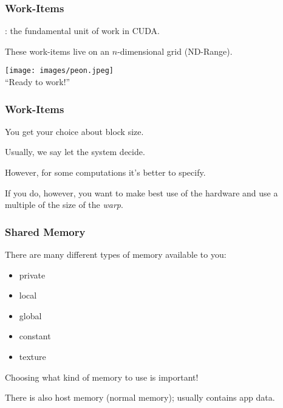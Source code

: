 \begin{frame}
  \frametitle{Work-Items}


    : the fundamental unit of work in CUDA.
    
 These work-items live on an $n$-dimensional grid (ND-Range).
    
    \begin{center}
	\texttt{[image: images/peon.jpeg]}\\
	\hfill ``Ready to work!''
	\end{center}
    
\end{frame}
    
\begin{frame}
\frametitle{Work-Items}
    
You get your choice about block size. 

Usually, we say let the system decide. 

However, for some computations it's better to specify.

If you do, however, you want to make best use of the hardware and use a multiple of the size of the \textit{warp}.


\end{frame}

\begin{frame}
  \frametitle{Shared Memory}


  There are many different types of memory available to you:


\begin{itemize}
\item private
\item local
\item global
\item constant
\item texture
\end{itemize}

Choosing what kind of memory to use is important!

There is also host memory (normal memory); usually contains app data.

\end{frame}


